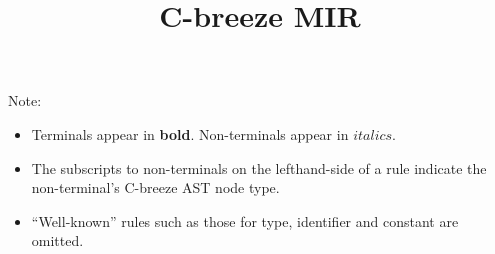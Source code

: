 \documentclass[10pt]{article}
\title{C-breeze MIR}
\author{}
\date{}
\begin{document}
\maketitle

 \setcounter{note}{1}

\newcommand{\m}[1]{\ensuremath{\mathit{#1}}}
\newcommand{\ar}{\ensuremath{\rightarrow}}
\newcommand{\ars}{\ensuremath{\rightarrow_{\thenote\addtocounter{note}{1}}}}
\renewcommand{\b}{\ensuremath{|\ }}
\newcommand{\ter}[1]{\textbf{#1}}
\newcommand{\tes}[1]{\ensuremath{\mathbf{#1}}}
\renewcommand{\t}{\textbf{;}}

Note:
\begin{itemize}
\item Terminals appear in \ter{bold}.  Non-terminals appear in \m{italics}.
\item The subscripts to non-terminals on the lefthand-side of a rule indicate
      the non-terminal's C-breeze AST node type.
\item ``Well-known'' rules such as those for type, identifier and constant are
  omitted.
\end{itemize}
\end{document}
